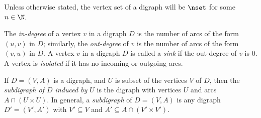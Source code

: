 Unless otherwise stated, the vertex set of
a digraph will be $\nset$ for some $n\in \N$. 

The \emph{in-degree} of a vertex $v$ in a digraph $D$ is the number of arcs
of the form $(u, v)$ in $D$; similarly, the \emph{out-degree} of $v$ is the
number of arcs of the form $(v, u)$ in $D$. A vertex $v$ in a digraph $D$ is
called a \emph{sink} if the out-degree of $v$ is $0$. A vertex is
\emph{isolated} if it has no incoming or outgoing arcs. 

If $D = (V, A)$ is a digraph, and $U$ is subset of the vertices $V$ of $D$,
then the \emph{subdigraph of $D$ induced by $U$} is the digraph with vertices
$U$ and arcs $A \cap (U\times U)$. In general, a \emph{subdigraph} of $D =
(V,A)$ is any digraph $D' = (V', A')$ with $V' \subseteq V$ and $A' \subseteq
A\cap (V' \times V')$.